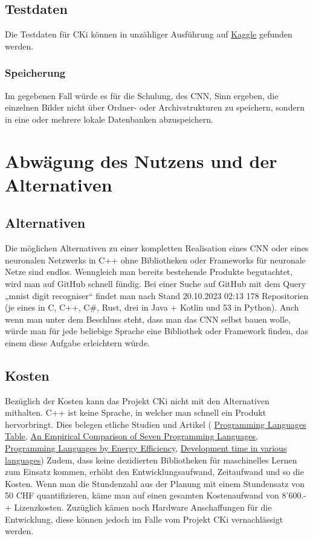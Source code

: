 \subsection{Testdaten}
\label{sec:AnalyseTestdaten}
Die Testdaten für CKi können in unzähliger Ausführung auf \href{https://www.kaggle.com/}{Kaggle} gefunden werden.

\subsubsection{Speicherung}
\label{sec:AnalyseSpeicherung}
Im gegebenen Fall würde es für die Schulung, des CNN, Sinn ergeben, die einzelnen Bilder nicht über Ordner- oder Archivstrukturen zu speichern, sondern in eine oder mehrere lokale Datenbanken abzuspeichern.

\section{Abwägung des Nutzens und der Alternativen}
\label{sec:AnalyseNutzwertanalyseDerLösungsvarianten}
\subsection{Alternativen}
\label{sec:AnalyseAlternativen}
Die möglichen Alternativen zu einer kompletten Realisation eines CNN oder eines neuronalen Netzwerks in C++ ohne Bibliotheken oder Frameworks für neuronale Netze sind endlos. 
Wenngleich man bereits bestehende Produkte begutachtet, wird man auf GitHub schnell fündig. Bei einer Suche auf GitHub mit dem Query „mnist digit recogniser“ findet man nach Stand 20.10.2023 02:13 178 Repositorien (je eines in C, C++, C\#, Rust, drei in Java + Kotlin und 53 in Python).
Auch wenn man unter dem Beschluss steht, dass man das CNN selbst bauen wolle, würde man für jede beliebige Sprache eine Bibliothek oder Framework finden, das einem diese Aufgabe erleichtern würde.

\subsection{Kosten}
\label{sec:AnalyseKosten}
Bezüglich der Kosten kann das Projekt CKi nicht mit den Alternativen mithalten. C++ ist keine Sprache, in welcher man schnell ein Produkt hervorbringt. Dies belegen etliche Studien und Artikel (
\href{https://www.cs.bsu.edu/homepages/dmz/cs697/langtbl.htm}{Programming Languages Table}, 
\href{https://citeseerx.ist.psu.edu/viewdoc/download?doi=10.1.1.113.1831&rep=rep1&type=pdf}{An Empirical Comparison of Seven Programming Languages},
\href{https://haslab.github.io/SAFER/scp21.pdf}{Programming Languages by Energy Efficiency}, 
\href{https://stackoverflow.com/questions/1894453/development-time-in-various-languages}{Development time in various languages})
Zudem, dass keine dezidierten Bibliotheken für maschinelles Lernen zum Einsatz kommen, erhöht den Entwicklungsaufwand, Zeitaufwand und so die Kosten.
Wenn man die Stundenzahl aus der Planung mit einem Stundensatz von 50 CHF quantifizieren, käme man auf einen gesamten Kostenaufwand von 8'600.- + Lizenzkosten. Zuzüglich kämen noch Hardware Anschaffungen für die Entwicklung, diese können jedoch im Falle vom Projekt CKi vernachlässigt werden.  

